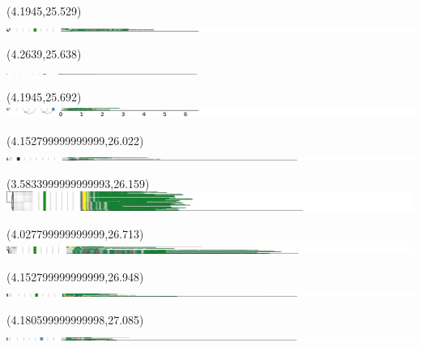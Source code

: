 \documentclass{article}
\begin{document}
\begin{textblock}{13}(4.1945,25.529)\includegraphics{haplotypes-constrained/16qtel_1-500K_1_12_12_rc-HG004.pdf}\end{textblock}
\begin{textblock}{13}(4.2639,25.638)\includegraphics{haplotypes-constrained/16qtel_1-500K_1_12_12_rc-HG006.pdf}\end{textblock}
\begin{textblock}{13}(4.1945,25.692)\includegraphics{haplotypes-constrained/16qtel_1-500K_1_12_12_rc-HG007.pdf}\end{textblock}
\begin{textblock}{13}(4.152799999999999,26.022)\includegraphics{haplotypes-constrained/18qtel_1-500K_1_12_12_rc-HG001.pdf}\end{textblock}
\begin{textblock}{13}(3.5833999999999993,26.159)\includegraphics{haplotypes-constrained/18qtel_1-500K_1_12_12_rc-HG002.pdf}\end{textblock}
\begin{textblock}{13}(4.027799999999999,26.713)\includegraphics{haplotypes-constrained/18qtel_1-500K_1_12_12_rc-HG003.pdf}\end{textblock}
\begin{textblock}{13}(4.152799999999999,26.948)\includegraphics{haplotypes-constrained/18qtel_1-500K_1_12_12_rc-HG004.pdf}\end{textblock}
\begin{textblock}{13}(4.180599999999998,27.085)\includegraphics{haplotypes-constrained/18qtel_1-500K_1_12_12_rc-HG005.pdf}\end{textblock}
\end{document}
